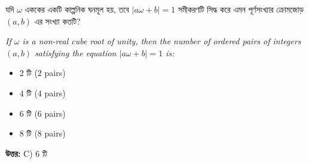 \documentclass[12pt, a4paper]{article}
\begin{document}
\begin{tcolorbox}[questionbox={প্রশ্ন (Question) 9}]
    \noindent
    যদি $\omega$ এককের একটি কাল্পনিক ঘনমূল হয়, তবে $|a\omega + b| = 1$ সমীকরণটি সিদ্ধ করে এমন পূর্ণসংখ্যার ক্রোমজোড় $(a, b)$ এর সংখ্যা কতটি?
    
    \vspace{0.8em}
    \begin{english}
    \noindent\textit{\color{darkgray}
    If $\omega$ is a non-real cube root of unity, then the number of ordered pairs of integers $(a, b)$ satisfying the equation $|a\omega + b| = 1$ is:
    }
    \end{english}
\end{tcolorbox}

\begin{itemize}[label={}, leftmargin=1cm, itemsep=0.5em]
    \item[\textbf{A)}] $2$ টি ($2$ pairs)
    \item[\textbf{B)}] $4$ টি ($4$ pairs)
    \item[\textbf{C)}] $6$ টি ($6$ pairs)
    \item[\textbf{D)}] $8$ টি ($8$ pairs)
\end{itemize}

\vspace{0.5em}
\begin{tcolorbox}[answerbox]
    \textbf{\color{success} উত্তর:} C) $6$ টি
\end{tcolorbox}
\vspace{1em}
\end{document}
